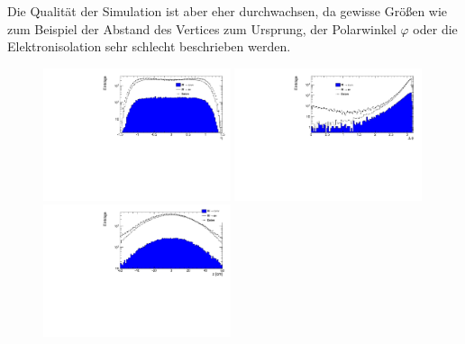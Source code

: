 \documentclass[a4paper,12pt]{article}
\begin{document}
Die Qualität der Simulation ist aber eher durchwachsen, da gewisse Größen wie zum Beispiel der
Abstand des Vertices zum Ursprung, der Polarwinkel $φ$ oder die Elektronisolation sehr schlecht
beschrieben werden.

\begin{figure}[h]
	\centering
	\newcommand{\halftext}{0.49\textwidth}
	\includegraphics[width=\halftext]{manualplots/eta.pdf}
	\includegraphics[width=\halftext]{manualplots/delta_phi.pdf}\\
	\includegraphics[width=\halftext]{manualplots/vertex_z.pdf}

\end{figure}
\end{document}
